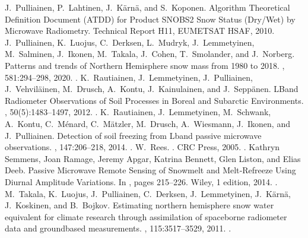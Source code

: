 \documentclass[letterpaper,10pt,english]{jupyterBook}
\begin{document}
\begin{sphinxthebibliography}{10}
\sphinxAtStartPar
J. Pulliainen, P. Lahtinen, J. Kärnä, and S. Koponen. Algorithm Theoretical Definition Document (ATDD) for Product SN\sphinxhyphen{}OBS\sphinxhyphen{}2 \sphinxhyphen{} Snow Status (Dry/Wet) by Microwave Radiometry. Technical Report H11, EUMETSAT H\sphinxhyphen{}SAF, 2010.
\sphinxAtStartPar
J. Pulliainen, K. Luojus, C. Derksen, L. Mudryk, J. Lemmetyinen, M. Salminen, J. Ikonen, M. Takala, J. Cohen, T. Smolander, and J. Norberg. Patterns and trends of Northern Hemisphere snow mass from 1980 to 2018. , 581:294–298, 2020. .
\sphinxAtStartPar
K. Rautiainen, J. Lemmetyinen, J. Pulliainen, J. Vehviläinen, M. Drusch, A. Kontu, J. Kainulainen, and J. Seppänen. L\sphinxhyphen{}Band Radiometer Observations of Soil Processes in Boreal and Subarctic Environments. , 50(5):1483–1497, 2012. .
\sphinxAtStartPar
K. Rautiainen, J. Lemmetyinen, M. Schwank, A. Kontu, C. Ménard, C. Mätzler, M. Drusch, A. Wiesmann, J. Ikonen, and J. Pulliainen. Detection of soil freezing from L\sphinxhyphen{}band passive microwave observations. , 147:206–218, 2014. .
\sphinxAtStartPar
W. Rees. . CRC Press, 2005. .
\sphinxAtStartPar
Kathryn Semmens, Joan Ramage, Jeremy Apgar, Katrina Bennett, Glen Liston, and Elias Deeb. Passive Microwave Remote Sensing of Snowmelt and Melt‐Refreeze Using Diurnal Amplitude Variations. In , pages 215–226. Wiley, 1 edition, 2014. .
\sphinxAtStartPar
M. Takala, K. Luojus, J. Pulliainen, C. Derksen, J. Lemmetyinen, J. Kärnä, J. Koskinen, and B. Bojkov. Estimating northern hemisphere snow water equivalent for climate research through assimilation of space\sphinxhyphen{}borne radiometer data and ground\sphinxhyphen{}based measurements. , 115:3517–3529, 2011. .

\end{sphinxthebibliography}
\end{document}
